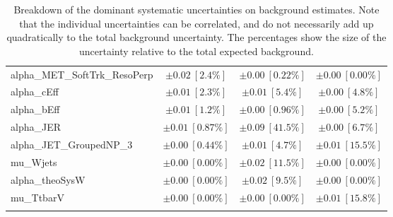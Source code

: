 \begin{sidewaystable}
\begin{center}
\begin{tabular*}{\textwidth}{@{\extracolsep{\fill}}lccc}
alpha\_MET\_SoftTrk\_ResoPerp         & $\pm 0.02\ [2.4\%] $          & $\pm 0.00\ [0.22\%] $          & $\pm 0.00\ [0.00\%] $       \\
alpha\_cEff         & $\pm 0.01\ [2.3\%] $          & $\pm 0.01\ [5.4\%] $          & $\pm 0.00\ [4.8\%] $       \\
alpha\_bEff         & $\pm 0.01\ [1.2\%] $          & $\pm 0.00\ [0.96\%] $          & $\pm 0.00\ [5.2\%] $       \\
alpha\_JER         & $\pm 0.01\ [0.87\%] $          & $\pm 0.09\ [41.5\%] $          & $\pm 0.00\ [6.7\%] $       \\
alpha\_JET\_GroupedNP\_3         & $\pm 0.00\ [0.44\%] $          & $\pm 0.01\ [4.7\%] $          & $\pm 0.01\ [15.5\%] $       \\
mu\_Wjets         & $\pm 0.00\ [0.00\%] $          & $\pm 0.02\ [11.5\%] $          & $\pm 0.00\ [0.00\%] $       \\
alpha\_theoSysW         & $\pm 0.00\ [0.00\%] $          & $\pm 0.02\ [9.5\%] $          & $\pm 0.00\ [0.00\%] $       \\
mu\_TtbarV         & $\pm 0.00\ [0.00\%] $          & $\pm 0.00\ [0.00\%] $          & $\pm 0.01\ [15.8\%] $       \\
\noalign{\smallskip}\hline\noalign{\smallskip}
\end{tabular*}
\end{center}
\caption[Breakdown of uncertainty on background estimates]{
Breakdown of the dominant systematic uncertainties on background estimates.
Note that the individual uncertainties can be correlated, and do not necessarily add up quadratically to 
the total background uncertainty. The percentages show the size of the uncertainty relative to the total expected background.
\label{table.results.bkgestimate.uncertainties.SRC5_bybkg}}
\end{sidewaystable}
%
